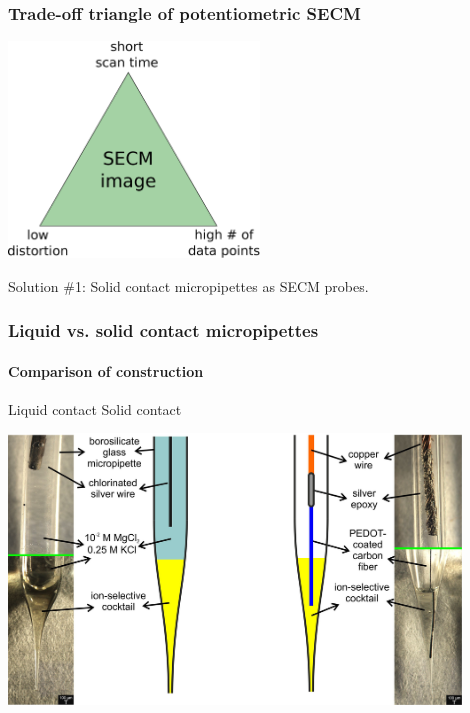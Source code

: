 \documentclass{beamer}
\begin{document}
\begin{frame}
\frametitle{Trade-off triangle of potentiometric SECM}
\begin{center}
\includegraphics[width=0.5\textwidth]{trade-off.eps}
\end{center}
\end{frame}

\begin{frame}[plain]
\centering
Solution \#1:
Solid contact micropipettes as SECM probes.
\end{frame}

\begin{frame}
\frametitle{Liquid vs. solid contact micropipettes}
\framesubtitle{Comparison of construction}
\begin{center}
\quad\quad\quad\quad Liquid contact \hfill Solid contact \quad\quad\quad\quad

\includegraphics[width=0.9\textwidth]{liquid_solid.jpg}
\end{center}
\end{frame}
\end{document}
